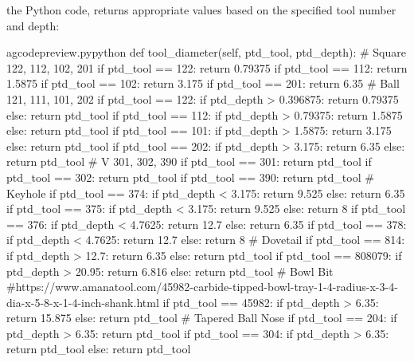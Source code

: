 \documentclass{ltxdoc}
\begin{document}
\noindent the Python code,  returns 
appropriate values based on the specified tool number and depth:
 
\lstset{firstnumber=\thegcpy}
\begin{writecode}{a}{gcodepreview.py}{python}
    def tool_diameter(self, ptd_tool, ptd_depth):
# Square 122, 112, 102, 201
        if ptd_tool == 122:
            return 0.79375
        if ptd_tool == 112:
            return 1.5875
        if ptd_tool == 102:
            return 3.175
        if ptd_tool == 201:
            return 6.35
# Ball 121, 111, 101, 202
        if ptd_tool == 122:
            if ptd_depth > 0.396875:
                return 0.79375
            else:
                return ptd_tool
        if ptd_tool == 112:
            if ptd_depth > 0.79375:
                return 1.5875
            else:
                return ptd_tool
        if ptd_tool == 101:
            if ptd_depth > 1.5875:
                return 3.175
            else:
                return ptd_tool
        if ptd_tool == 202:
            if ptd_depth > 3.175:
                return 6.35
            else:
                return ptd_tool
# V 301, 302, 390
        if ptd_tool == 301:
            return ptd_tool
        if ptd_tool == 302:
            return ptd_tool
        if ptd_tool == 390:
            return ptd_tool
# Keyhole
        if ptd_tool == 374:
            if ptd_depth < 3.175:
                return 9.525
            else:
                return 6.35
        if ptd_tool == 375:
            if ptd_depth < 3.175:
                return 9.525
            else:
                return 8
        if ptd_tool == 376:
            if ptd_depth < 4.7625:
                return 12.7
            else:
                return 6.35
        if ptd_tool == 378:
            if ptd_depth < 4.7625:
                return 12.7
            else:
                return 8
# Dovetail
        if ptd_tool == 814:
            if ptd_depth > 12.7:
                return 6.35
            else:
                return ptd_tool
        if ptd_tool == 808079:
            if ptd_depth > 20.95:
                return 6.816
            else:
                return ptd_tool
# Bowl Bit
#https://www.amanatool.com/45982-carbide-tipped-bowl-tray-1-4-radius-x-3-4-dia-x-5-8-x-1-4-inch-shank.html 
        if ptd_tool == 45982:
            if ptd_depth > 6.35:
                return 15.875
            else:
                return ptd_tool
# Tapered Ball Nose
        if ptd_tool == 204:
            if ptd_depth > 6.35:
                return ptd_tool
        if ptd_tool == 304:
            if ptd_depth > 6.35:
                return ptd_tool
            else:
                return ptd_tool

\end{writecode}
\addtocounter{gcpy}{87}
\end{document}
